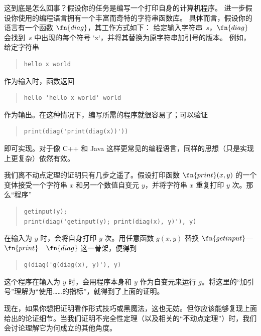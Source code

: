 \documentclass[../../../include/open-logic-section]{subfiles}
\begin{document}
\begin{explain}
这到底是怎么回事？假设你的任务是编写一个打印自身的计算机程序。
进一步假设你使用的编程语言拥有一个丰富而奇特的字符串函数库。
具体而言，假设你的语言有一个函数 $\fn{diag}$，其工作方式如下：
给定输入字符串~$s$，$\fn{diag}$ 会找到~$s$ 中出现的每个符号 `x`，并将其替换为原字符串加引号的版本。
例如，给定字符串
\begin{quote}
\begin{verbatim}
hello x world
\end{verbatim}
\end{quote}
作为输入时，函数返回
\begin{quote}
\begin{verbatim}
hello 'hello x world' world
\end{verbatim}
\end{quote}
作为输出。在这种情况下，编写所需的程序就很容易了；可以验证
\begin{quote}
\begin{verbatim}
print(diag('print(diag(x))'))
\end{verbatim}
\end{quote}
即可实现。对于像 C++ 和 Java 这样更常见的编程语言，同样的思想（只是实现上更复杂）依然有效。

我们离不动点定理的证明只有几步之遥了。假设打印函数 $\fn{print}(x,y)$ 的一个变体接受一个字符串 $x$ 和另一个数值自变元 $y$，并将字符串 $x$ 重复打印 $y$ 次。那么“程序”
\begin{quote}
\begin{verbatim}
getinput(y);
print(diag('getinput(y); print(diag(x), y)'), y)
\end{verbatim}
\end{quote}
在输入为 $y$ 时，会将自身打印 $y$ 次。用任意函数 $g(x,y)$ 替换 $\fn{getinput}$---$\fn{print}$---$\fn{diag}$ 这一骨架，便得到
\begin{quote}
\begin{verbatim}
g(diag('g(diag(x), y)'), y)
\end{verbatim}
\end{quote}
这个程序在输入为 $y$ 时，会用程序本身和 $y$ 作为自变元来运行 $g$。将这里的“加引号”理解为“使用……的指标”，就得到了上面的证明。

现在，如果你想把证明看作形式技巧或黑魔法，这也无妨。但你应该能够复现上面给出的论证细节。当我们证明不完全性定理（以及相关的“不动点定理”）时，我们会讨论理解它为何成立的其他角度。
\end{explain}
\end{document}
